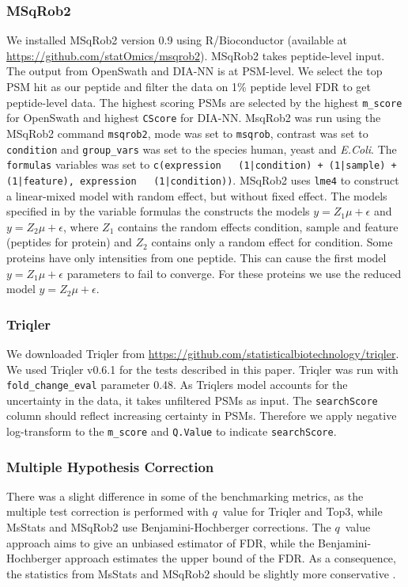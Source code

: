 \documentclass[10pt,letterpaper]{article}
\begin{document}
\subsubsection*{MSqRob2}
%
We installed MSqRob2 version 0.9 using R/Bioconductor (available at \url{https://github.com/statOmics/msqrob2}). MSqRob2 takes peptide-level input. The output from OpenSwath and DIA-NN is at PSM-level. We select the top PSM hit as our peptide and filter the data on 1\% peptide level FDR to get peptide-level data. The highest scoring PSMs are selected by the highest \texttt{m\_score} for OpenSwath and highest \texttt{CScore} for DIA-NN. MsqRob2 was run using the MSqRob2 command \texttt{msqrob2}, mode was set to \texttt{msqrob}, contrast was set to \texttt{condition} and \texttt{group\_vars} was set to the species human, yeast and \textit{E.Coli}. The \texttt{formulas} variables was set to \texttt{c(expression ~ (1|condition) + (1|sample) + (1|feature), expression ~ (1|condition))}.
MSqRob2 uses \texttt{lme4} to construct a linear-mixed model with random effect, but without fixed effect. The models specified in by the variable formulas the constructs the models $y = Z_1 \mu + \epsilon$ and $y = Z_2 \mu + \epsilon$, where $Z_1$ contains the random effects condition, sample and feature (peptides for protein) and $Z_2$ contains only a random effect for condition. Some proteins have only intensities from one peptide. This can cause the first model $y = Z_1 \mu + \epsilon$ parameters to fail to converge. For these proteins we use the reduced model $y = Z_2 \mu + \epsilon$.

\subsubsection*{Triqler}

We downloaded Triqler from \url{https://github.com/statisticalbiotechnology/triqler}. We used Triqler v0.6.1 for the tests described in this paper. Triqler was run with \texttt{fold\_change\_eval} parameter 0.48. As Triqlers model accounts for the uncertainty in the data, it takes unfiltered PSMs as input. The \texttt{searchScore} column should reflect increasing certainty in PSMs. Therefore we apply negative log-transform to the \texttt{m\_score} and \texttt{Q.Value} to indicate \texttt{searchScore}. 

\subsubsection*{Multiple Hypothesis Correction}
There was a slight difference in some of the benchmarking metrics, as the multiple test correction is performed with $q$~value for Triqler and Top3, while MsStats and MSqRob2 use Benjamini-Hochberger \cite{benjamini1995controlling} corrections. The $q$~value approach aims to give an unbiased estimator of FDR, while the Benjamini-Hochberger approach estimates the upper bound of the FDR. As a consequence, the statistics from MsStats and MSqRob2 should be slightly more conservative \cite{korthauer2019practical}.
\end{document}
